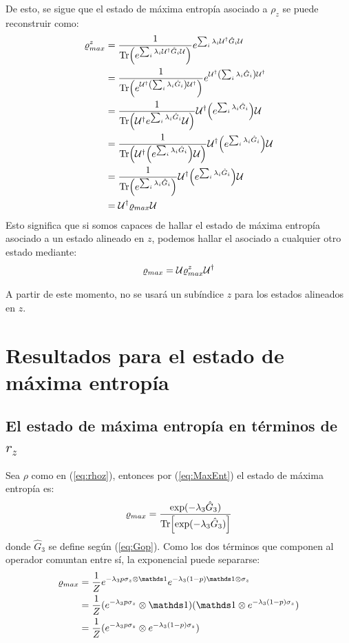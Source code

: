 De esto, se sigue que el estado de máxima entropía asociado a $\rho_{z}$ se puede reconstruir como:
\begin{align*}
\varrho_{max}^{z}&=\frac{1}{\Tr(e^{\sum_{i}\lambda_{i}\mathcal{U}^{\dag}\hat{G}_{i}\mathcal{U}})}e^{\sum_{i}\lambda_{i}\mathcal{U}^{\dag}\hat{G}_{i}\mathcal{U}}\\
&=\frac{1}{\Tr(e^{\mathcal{U}^{\dag}\qty(\sum_{i}\lambda_{i}\hat{G}_{i})\mathcal{U}^{\dag}})}e^{\mathcal{U}^{\dag}\qty(\sum_{i}\lambda_{i}\hat{G}_{i})\mathcal{U}^{\dag}}\\
&=\frac{1}{\Tr(\mathcal{U}^{\dag}e^{\sum_{i}\lambda_{i}\hat{G}_{i}}\mathcal{U})}\mathcal{U}^{\dag}\qty(e^{\sum_{i}\lambda_{i}\hat{G}_{i}})\mathcal{U}\\
&=\frac{1}{\Tr(\mathcal{U}^{\dag}\qty(e^{\sum_{i}\lambda_{i}\hat{G}_{i}})\mathcal{U})}\mathcal{U}^{\dag}\qty(e^{\sum_{i}\lambda_{i}\hat{G}_{i}})\mathcal{U}\\
&=\frac{1}{\Tr(e^{\sum_{i}\lambda_{i}\hat{G}_{i}})}\mathcal{U}^{\dag}\qty(e^{\sum_{i}\lambda_{i}\hat{G}_{i}})\mathcal{U}\\
&=\mathcal{U}^{\dag}\varrho_{max}\mathcal{U}
\end{align*}
Esto significa que si somos capaces de hallar el estado de máxima entropía asociado a un estado alineado en $z$, podemos hallar el asociado a cualquier otro estado mediante:
\begin{equation}
\varrho_{max}=\mathcal{U}\varrho_{max}^{z}\mathcal{U}^{\dag}
\end{equation}

A partir de este momento, no se usará un subíndice $z$ para los estados alineados en $z$.

\newpage

\section{Resultados para el estado de máxima entropía}

\subsection{El estado de máxima entropía en términos de $r_{z}$}
Sea $\rho$ como en (\ref{eq:rhoz}), entonces por (\ref{eq:MaxEnt}) el estado de máxima entropía es:
\begin{equation}\label{eq:MaxEntZ}
\varrho_{max}=\frac{\text{exp}(-\lambda_{3}\hat{G}_{3})}{\Tr[\text{exp}(-\lambda_{3}\hat{G}_{3})]}
\end{equation}
donde $\hat{G}_{3}$ se define según (\ref{eq:Gop}). Como los dos términos que componen al operador comuntan entre sí, la exponencial puede separarse:
\begin{align*}
\varrho_{max}&=\frac{1}{Z}e^{-\lambda_{3}p\sigma_{z}\otimes\Id}e^{-\lambda_{3}(1-p)\Id\otimes\sigma_{z}}\\
&=\frac{1}{Z}(e^{-\lambda_{3}p\sigma_{z}}\otimes\Id)( \Id\otimes e^{-\lambda_{3}(1-p)\sigma_{z}})\\
&=\frac{1}{Z}(e^{-\lambda_{3}p\sigma_{z}}\otimes e^{-\lambda_{3}(1-p)\sigma_{z}})\\
\end{align*}

